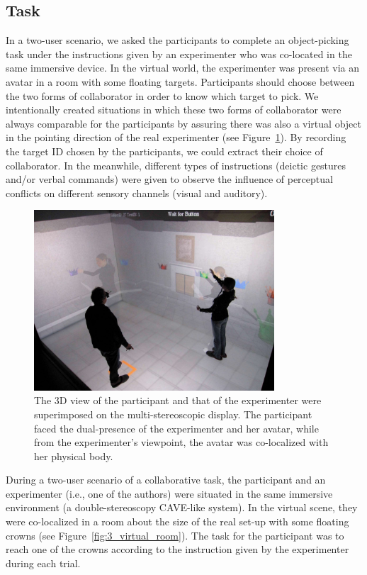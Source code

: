 \subsection{Task}
In a two-user scenario, we asked the participants to complete an object-picking task under the instructions given by an experimenter who was co-located in the same immersive device. In the virtual world, the experimenter was present via an avatar in a room with some floating targets. Participants should choose between the two forms of collaborator in order to know which target to pick. We intentionally created situations in which these two forms of collaborator were always comparable for the participants by assuring there was also a virtual object in the pointing direction of the real experimenter (see Figure~\ref{fig:3_demo}). By recording the target ID chosen by the participants, we could extract their choice of collaborator. In the meanwhile, different types of instructions (deictic gestures and/or verbal commands) were given to observe the influence of perceptual conflicts on different sensory channels (visual and auditory).

\begin{figure}[tb]
  \centering
  \includegraphics[width=0.8\textwidth]{figures/ch3/demo}
  \caption{\label{fig:3_demo}The 3D view of the participant and that of the experimenter were superimposed on the multi-stereoscopic display. The participant faced the dual-presence of the experimenter and her avatar, while from the experimenter's viewpoint, the avatar was co-localized with her physical body.}
\end{figure}


During a two-user scenario of a collaborative task, the participant and an experimenter (i.e., one of the authors) were situated in the same immersive environment (a double-stereoscopy CAVE-like system). In the virtual scene, they were co-localized in a room about the size of the real set-up with some floating crowns (see Figure~\ref{fig:3_virtual_room}). The task for the participant was to reach one of the crowns according to the instruction given by the experimenter during each trial.

